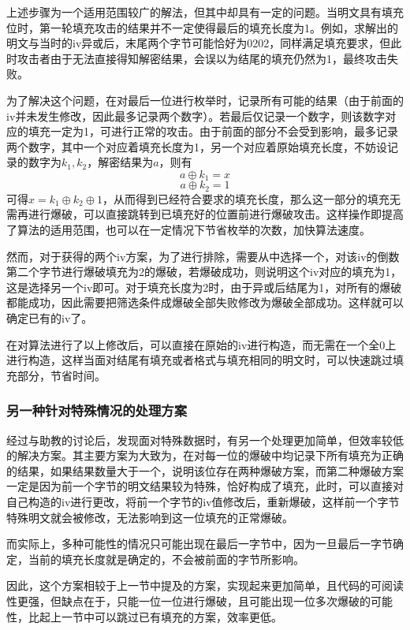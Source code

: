 \documentclass[a4paper, zihao=-4, UTF-8]{ctexart}
\begin{document}
					上述步骤为一个适用范围较广的解法，但其中却具有一定的问题。当明文具有填充位时，第一轮填充攻击的结果并不一定使得最后的填充长度为1。例如，求解出的明文与当时的iv异或后，末尾两个字节可能恰好为0202，同样满足填充要求，但此时攻击者由于无法直接得知解密结果，会误以为结尾的填充仍然为1，最终攻击失败。
					
					为了解决这个问题，在对最后一位进行枚举时，记录所有可能的结果（由于前面的iv并未发生修改，因此最多记录两个数字）。若最后仅记录一个数字，则该数字对应的填充一定为1，可进行正常的攻击。由于前面的部分不会受到影响，最多记录两个数字，其中一个对应着填充长度为1，另一个对应着原始填充长度，不妨设记录的数字为$k_1,k_2$，解密结果为$a$，则有
					$$a\oplus k_1=x$$ $$a\oplus k_2=1$$
					可得$x=k_1\oplus k_2\oplus 1$，从而得到已经符合要求的填充长度，那么这一部分的填充无需再进行爆破，可以直接跳转到已填充好的位置前进行爆破攻击。这样操作即提高了算法的适用范围，也可以在一定情况下节省枚举的次数，加快算法速度。
					
					然而，对于获得的两个iv方案，为了进行排除，需要从中选择一个，对该iv的倒数第二个字节进行爆破填充为2的爆破，若爆破成功，则说明这个iv对应的填充为1，这是选择另一个iv即可。对于填充长度为2时，由于异或后结尾为1，对所有的爆破都能成功，因此需要把筛选条件成爆破全部失败修改为爆破全部成功。这样就可以确定已有的iv了。
					
					在对算法进行了以上修改后，可以直接在原始的iv进行构造，而无需在一个全0上进行构造，这样当面对结尾有填充或者格式与填充相同的明文时，可以快速跳过填充部分，节省时间。
					
					\subsubsection{另一种针对特殊情况的处理方案}
					
					经过与助教的讨论后，发现面对特殊数据时，有另一个处理更加简单，但效率较低的解决方案。其主要方案为大致为，在对每一位的爆破中均记录下所有填充为正确的结果，如果结果数量大于一个，说明该位存在两种爆破方案，而第二种爆破方案一定是因为前一个字节的明文结果较为特殊，恰好构成了填充，此时，可以直接对自己构造的iv进行更改，将前一个字节的iv值修改后，重新爆破，这样前一个字节特殊明文就会被修改，无法影响到这一位填充的正常爆破。
					
					而实际上，多种可能性的情况只可能出现在最后一字节中，因为一旦最后一字节确定，当前的填充长度就是确定的，不会被前面的字节所影响。
					
					因此，这个方案相较于上一节中提及的方案，实现起来更加简单，且代码的可阅读性更强，但缺点在于，只能一位一位进行爆破，且可能出现一位多次爆破的可能性，比起上一节中可以跳过已有填充的方案，效率更低。
\end{document}
